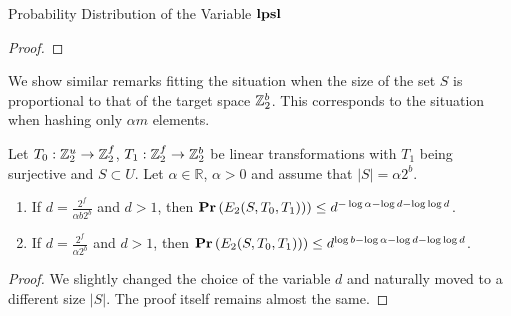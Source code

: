 \begin{section}{Probability Distribution of the Variable \texorpdfstring{$\mathbf{lpsl}$}{lpsl}}
\begin{proof}
%
%
%
\end{proof}

We show similar remarks fitting the situation when the size of the set $S$ is proportional to that of the target space $\mathbb{Z}_{2}^{b}$. This corresponds to the situation when hashing only $\alpha m$ elements.

\begin{statement}
\label{statement-e2-probability-linear-good}
Let $T_0: \mathbb{Z}_{2}^{u} \rightarrow \mathbb{Z}_{2}^{f}$, $T_1: \mathbb{Z}_{2}^{f} \rightarrow \mathbb{Z}_{2}^{b}$ be linear transformations with $T_1$ being surjective and $S \subset U$. Let $\alpha \in \mathbb{R}$, $\alpha > 0$ and assume that $|S| = \alpha 2 ^ b$.
\begin{enumerate}
\item If $d = \frac{2 ^ f}{\alpha b 2 ^ b}$ and $d > 1$, then $\mathbf{Pr}\left(E_2(S, T_0, T_1))\right) \leq d ^ {-\log \alpha - \log d - \log \log d}$.
\item If $d = \frac{2 ^ f}{\alpha 2 ^ b}$ and $d > 1$, then $\mathbf{Pr}\left(E_2(S, T_0, T_1))\right) \leq d ^ {\log b - \log \alpha - \log d - \log \log d}$.
\end{enumerate}
\end{statement}
\begin{proof}
We slightly changed the choice of the variable $d$ and naturally moved to a different size $|S|$. The proof itself remains almost the same.


\end{proof}
\end{section}
